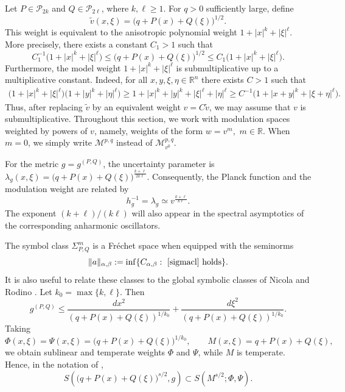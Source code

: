 \documentclass[12pt, reqno]{amsart}
\theoremstyle{definition}
\theoremstyle{remark}
\numberwithin{equation}{section}
\begin{document}
Let $P\in\mathcal P_{2k}$ and $Q\in\mathcal P_{2\ell}$, where $k,\ell\geq1$. For $q>0$ sufficiently large, define
\[
    \widetilde v(x,\xi)
    =
    \big(q+P(x)+Q(\xi)\big)^{1/2}.
\]
This weight is equivalent to the anisotropic polynomial weight $1+|x|^k+|\xi|^\ell.$
More precisely, there exists a constant $C_1>1$ such that
$$C_1^{-1}\big(1+|x|^k+|\xi|^\ell\big)  \leq
    \big(q+P(x)+Q(\xi)\big)^{1/2} \leq
    C_1\big(1+|x|^k+|\xi|^\ell\big).$$
Furthermore, the model weight $1+|x|^k+|\xi|^\ell$ is submultiplicative up to a multiplicative constant. Indeed, for all $x,y,\xi,\eta\in\mathbb R^n$ there exists $C>1$ such that
\begin{align*}
\big(1+|x|^k+|\xi|^\ell\big)
 \big(1+|y|^k+|\eta|^\ell\big)  \geq
1+|x|^k+|y|^k+|\xi|^\ell+|\eta|^\ell  \geq
C^{-1}
\big(1+|x+y|^k+|\xi+\eta|^\ell\big).
\end{align*}
Thus, after replacing $\widetilde v$ by an equivalent weight $v=C\widetilde v$, we may assume that $v$ is submultiplicative. Throughout this section, we work with modulation spaces weighted by powers of $v$, namely, weights of the form $w=v^m,\,\, m\in\mathbb R.$
When $m=0$, we simply write $\mathcal M^{p,q}$ instead of $\mathcal M_{v^0}^{p,q}$.

For the metric $g=g^{(P,Q)}$, the uncertainty parameter is $ \lambda_g(x,\xi)=\big(q+P(x)+Q(\xi)\big)^{\frac{k+\ell}{2k\ell}}.$
Consequently, the Planck function and the modulation weight are related by
\begin{equation}
    h_g^{-1}
    =
    \lambda_g
    \simeq
    v^{\frac{k+\ell}{k\ell}} .
\end{equation}
The exponent $(k+\ell)/(k\ell)$ will also appear in the spectral asymptotics of the corresponding anharmonic oscillators.

The symbol class $\Sigma_{P,Q}^m$ is a Fr\'echet space when equipped with the seminorms
\[
    \Vert a\Vert_{\alpha,\beta}
    :=
    \inf\{C_{\alpha,\beta}:\ \eqref{sigmacl}\ \text{holds}\}.
\]
It is also useful to relate these classes to the global symbolic classes of Nicola and Rodino \cite{NicolaRodino}. Let $   k_0=\max\{k,\ell\}.$
Then
\begin{equation}
\label{anhmet012hh}
    g^{(P,Q)}
    \leq
    \frac{dx^2}{(q+P(x)+Q(\xi))^{1/k_0}}
    +
    \frac{d\xi^2}{(q+P(x)+Q(\xi))^{1/k_0}} .
\end{equation}
Taking
\[
    \Phi(x,\xi)=\Psi(x,\xi)
    =
    \big(q+P(x)+Q(\xi)\big)^{1/k_0},
    \qquad
    M(x,\xi)=q+P(x)+Q(\xi),
\]
we obtain sublinear and temperate weights $\Phi$ and $\Psi$, while $M$ is temperate. Hence, in the notation of \cite{NicolaRodino},
\begin{equation}
\label{ineqclassa}
    S\left(
    \big(q+P(x)+Q(\xi)\big)^{s/2},
    g
    \right)
    \subset
    S(M^{s/2};\Phi,\Psi).
\end{equation}
\end{document}
